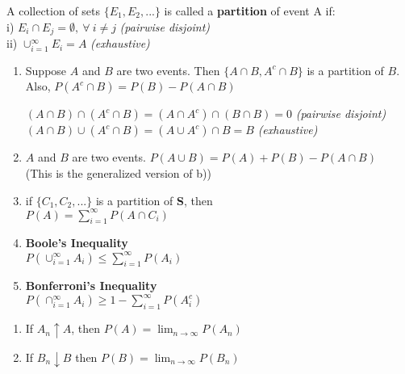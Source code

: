 \documentclass[14pt, oneside, letterpaper]{notes}
\begin{document}
%
%

\begin{mydef}
	A collection of sets $\{E_1, E_2, ...\}$ is called a \textbf{partition} 
		of event A if: \\
	\indent i) $E_i \cap E_j = \emptyset, \: \forall \: i \neq j$ 
		\textit{(pairwise disjoint)} \\
  	\indent ii) $\cup_{i=1}^{\infty}E_i = A$ 
		\textit{(exhaustive)}
\end{mydef}

\begin{enumerate}
	\item Suppose $A$ and $B$ are two events.  Then $\{A \cap B, A^c \cap B\}$
	is a partition of $B$.  Also, $P(A^c \cap B) = P(B) - P(A \cap B)$ 

	\begin{myproof}
		$(A \cap B) \cap (A^c \cap B) = 
		(A \cap A^c) \cap (B \cap B) = 0$  \textit{(pairwise disjoint)} \\
		$(A \cap B) \cup (A^c \cap B) = (A \cup A^c) \cap B = B $ 
		\textit{(exhaustive)} 
	\end{myproof}

	\item $A$ and $B$ are two events.  $P(A \cup B) = P(A) + P(B) - P(A \cap B)$ \\
	(This is the generalized version of b)) 

	\item if $\{C_1, C_2, ... \}$ is a partition of \textbf{S}, then \\
	$P(A) = \sum_{i=1}^{\infty} P(A \cap C_i)$ 

	\item\textbf{Boole's Inequality} \\
	\indent $P(\cup_{i=1}^{\infty} A_i) \leq \sum_{i=1}^{\infty}P(A_i)$ 
	
	\item \textbf{Bonferroni's Inequality}\\
	$P(\cap_{i=1}^{\infty} A_i) \geq 1 - \sum_{i=1}^{\infty} P(A_i^c)$
\end{enumerate}

\begin{enumerate}
	\item If $A_n \uparrow A$, then $P(A) = \lim_{n \to \infty} P(A_n)$ 

	\item If $B_n \downarrow B$ then $P(B) = \lim_{n \to \infty} P(B_n)$ 
\end{enumerate}
\end{document}
